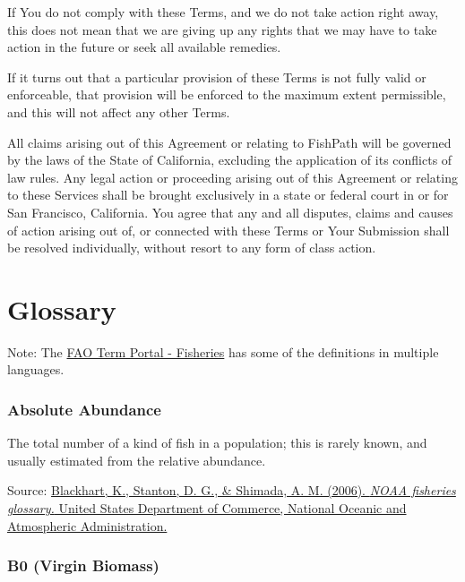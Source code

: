 \documentclass[
  11pt,
]{book}
\begin{document}
If You do not comply with these Terms, and we do not take action right away, this does not mean that we are giving up any rights that we may have to take action in the future or seek all available remedies.

If it turns out that a particular provision of these Terms is not fully valid or enforceable, that provision will be enforced to the maximum extent permissible, and this will not affect any other Terms.

All claims arising out of this Agreement or relating to FishPath will be governed by the laws of the State of California, excluding the application of its conflicts of law rules. Any legal action or proceeding arising out of this Agreement or relating to these Services shall be brought exclusively in a state or federal court in or for San Francisco, California. You agree that any and all disputes, claims and causes of action arising out of, or connected with these Terms or Your Submission shall be resolved individually, without resort to any form of class action.

\hypertarget{glossary}{%
\chapter{Glossary}\label{glossary}}





Note: The \href{http://www.fao.org/fishery/glossary/en}{FAO Term Portal - Fisheries} has some of the definitions in multiple languages.

\hypertarget{absolute-abundance}{%
\subsection{Absolute Abundance}\label{absolute-abundance}}

The total number of a kind of ﬁsh in a population; this is rarely known, and usually estimated from the relative abundance.

Source: \href{https://repository.library.noaa.gov/view/noaa/12856}{Blackhart, K., Stanton, D. G., \& Shimada, A. M. (2006). \emph{NOAA fisheries glossary.} United States Department of Commerce, National Oceanic and Atmospheric Administration.}

\hypertarget{b0-virgin-biomass}{%
\subsection{B0 (Virgin Biomass)}\label{b0-virgin-biomass}}
\end{document}
